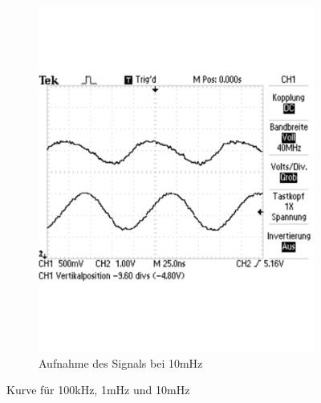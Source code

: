 \documentclass[12pt,a4paper]{article}
\begin{document}
\begin{figure}[H]
\begin{subfigure}[b]{0.28\textwidth}
                \includegraphics[width=\textwidth , scale = 0.4]{2_2_10m.pdf}
                \caption[Aufnahme des Signals bei 10mHz]{Aufnahme des Signals bei 10mHz}
  				\label{fig:2_2_10m}
        \end{subfigure}
        \caption{Kurve  für 100kHz, 1mHz und 10mHz}
        \label{fig:2_2_b}
\end{figure}
\end{document}

